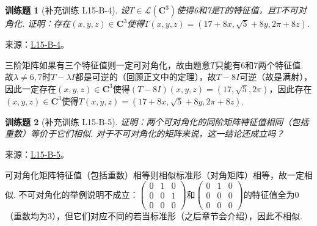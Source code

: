 \documentclass[12pt,fontset=fandol]{ctexart}
\newtheorem{exercise}{训练题}[section]
\begin{document}
\begin{exercise}[补充训练 L15-B-4]\label{prob:L15-B-4}
设$T\in \mathcal{L}(\mathbf{C}^3)$使得6和7是$T$的特征值，且$T$不可对角化. 证明：存在$(x,y,z)\in\mathbf{C}^3$使得$T(x,y,z)=(17+8x,\sqrt{5}+8y,2\pi+8z)$.
\end{exercise}
\noindent 来源：\href{https://github.com/yhwu-is/Linear-Algebra-Left-Undone/blob/new/%E8%AE%B2%E4%B9%89/%E4%B8%93%E9%A2%98/15%20%E7%9B%B8%E4%BC%BC%E6%A0%87%E5%87%86%E5%BD%A2%EF%BC%9A%E5%A4%8D%E6%95%B0%E5%9F%9F%E4%B8%8A%E7%9A%84%E5%B0%9D%E8%AF%95%E4%B8%8E%E7%90%86%E8%AE%BA.tex}{L15-B-4}。
\begin{solve}
三阶矩阵如果有三个特征值则一定可对角化，故由题意$T$只能有6和7两个特征值. 故$\lambda\neq 6,7$时$T-\lambda I$都是可逆的（回顾正文中的定理），故$T-8I$可逆（故是满射），因此一定存在$(x,y,z)\in\mathbf{C}^3$使得$(T-8I)(x,y,z)=(17,\sqrt{5},2\pi)$，因此存在$(x,y,z)\in\mathbf{C}^3$使得$T(x,y,z)=(17+8x,\sqrt{5}+8y,2\pi+8z)$.
\end{solve}

\begin{exercise}[补充训练 L15-B-5]\label{prob:L15-B-5}
证明：两个可对角化的同阶矩阵特征值相同（包括重数）等价于它们相似. 对于不可对角化的矩阵来说，这一结论还成立吗？
\end{exercise}
\noindent 来源：\href{https://github.com/yhwu-is/Linear-Algebra-Left-Undone/blob/new/%E8%AE%B2%E4%B9%89/%E4%B8%93%E9%A2%98/15%20%E7%9B%B8%E4%BC%BC%E6%A0%87%E5%87%86%E5%BD%A2%EF%BC%9A%E5%A4%8D%E6%95%B0%E5%9F%9F%E4%B8%8A%E7%9A%84%E5%B0%9D%E8%AF%95%E4%B8%8E%E7%90%86%E8%AE%BA.tex}{L15-B-5}。
\begin{solve}
可对角化矩阵特征值（包括重数）相等则相似标准形（对角矩阵）相等，故一定相似. 不可对角化的举例说明不成立：$\begin{pmatrix}
                0 & 1 & 0 \\ 0 & 0 & 1 \\ 0 & 0 & 0
            \end{pmatrix}$和$\begin{pmatrix}
                0 & 1 & 0 \\ 0 & 0 & 0 \\ 0 & 0 & 0
            \end{pmatrix}$的特征值全为0（重数均为3），但它们对应不同的若当标准形（之后章节会介绍），因此不相似.
\end{solve}
\end{document}
